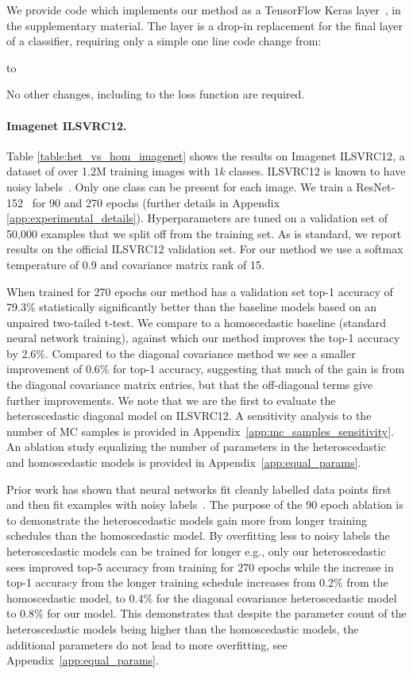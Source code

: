 \documentclass[final]{cvpr}
\begin{document}
We provide code which implements our method as a TensorFlow Keras layer~\cite{abadi2016tensorflow,chollet2015keras}, in the supplementary material. The layer is a drop-in replacement for the final layer of a classifier, requiring only a simple one line code change from:

to

No other changes, including to the loss function are required.

\paragraph{Imagenet ILSVRC12.} Table \ref{table:het_vs_hom_imagenet} shows the results on Imagenet ILSVRC12, a dataset of over 1.2M training images with $1k$ classes. ILSVRC12 is known to have noisy labels~\cite{beyer2020we}. Only one class can be present for each image. We train a ResNet-152~\cite{he2016deep} for 90 and 270 epochs (further details in Appendix \ref{app:experimental_details}). Hyperparameters are tuned on a validation set of 50,000 examples that we split off from the training set. As is standard, we report results on the official ILSVRC12 validation set. For our method we use a softmax temperature of 0.9 and covariance matrix rank of 15.

When trained for 270 epochs our method has a validation set top-1 accuracy of 79.3\% statistically significantly better than the baseline models based on an unpaired two-tailed t-test. We compare to a homoscedastic baseline (standard neural network training), against which our method improves the top-1 accuracy by 2.6\%. Compared to the diagonal covariance method we see a smaller improvement of 0.6\% for top-1 accuracy, suggesting that much of the gain is from the diagonal covariance matrix entries, but that the off-diagonal terms give further improvements. We note that we are the first to evaluate the heteroscedastic diagonal model on ILSVRC12. A sensitivity analysis to the number of MC samples is provided in Appendix~\ref{app:mc_samples_sensitivity}. An ablation study equalizing the number of parameters in the heteroscedastic and homoscedastic models is provided in Appendix~\ref{app:equal_params}.

Prior work has shown that neural networks fit cleanly labelled data points first and then fit examples with noisy labels~\cite{krueger2017closer}. The purpose of the 90 epoch ablation is to demonstrate the heteroscedastic models gain more from longer training schedules than the homoscedastic model. By overfitting less to noisy labels the heteroscedastic models can be trained for longer e.g., only our heteroscedastic sees improved top-5 accuracy from training for 270 epochs while the increase in top-1 accuracy from the longer training schedule increases from 0.2\% from the homoscedastic model, to 0.4\% for the diagonal covariance heteroscedastic model to 0.8\% for our model. This demonstrates that despite the parameter count of the heteroscedastic models being higher than the homoscedastic models, the additional parameters do not lead to more overfitting, see Appendix~\ref{app:equal_params}.
\end{document}
